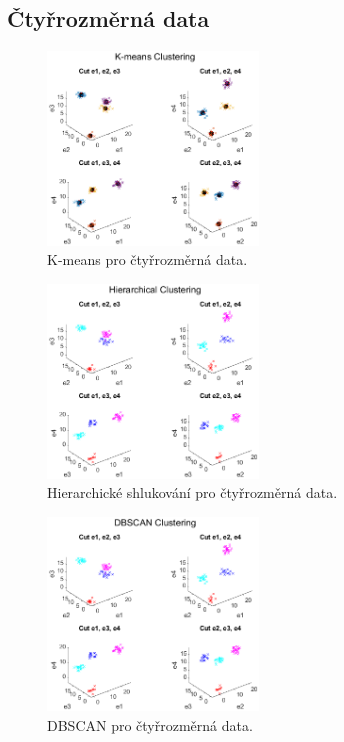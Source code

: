 \subsection{Čtyřrozměrná data}

\begin{figure}[H]
    \centering
    \includegraphics[width=0.5\textwidth]{images/4D_kmeans.eps}
    \caption{K-means pro čtyřrozměrná data.}
\end{figure}

\begin{figure}[H]
    \centering
    \includegraphics[width=0.5\textwidth]{images/4D_hierar.eps}
    \caption{Hierarchické shlukování pro čtyřrozměrná data.}
\end{figure}

\begin{figure}[H]
    \centering
    \includegraphics[width=0.5\textwidth]{images/4D_DBSCAN.eps}
    \caption{DBSCAN pro čtyřrozměrná data.}
\end{figure}

